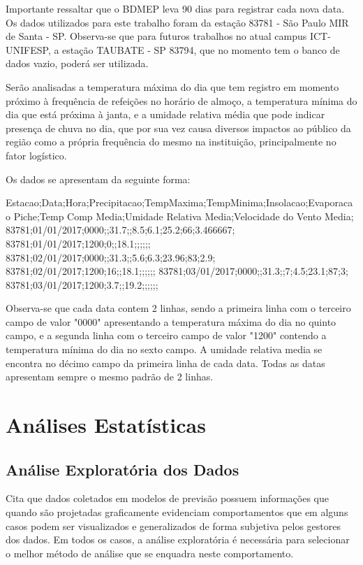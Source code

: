 \documentclass[	12pt, Times, openright, twoside, a4paper, english, brazil]{abntex2}
\begin{document}
Importante ressaltar que o BDMEP leva 90 dias para registrar cada nova data.
Os dados utilizados para este trabalho foram da estação 83781 - São Paulo MIR de Santa - SP.
Observa-se que para futuros trabalhos no atual campus ICT-UNIFESP, a estação TAUBATE - SP 83794, que no momento tem o banco de dados vazio, poderá ser utilizada.

Serão analisadas a temperatura máxima do dia que tem registro em momento próximo à frequência de refeições no horário de almoço, a temperatura mínima do dia que está próxima à janta, e a umidade relativa média que pode indicar presença de chuva no dia, que por sua vez causa diversos impactos ao público da região como a própria frequência do mesmo na instituição, principalmente no fator logístico. 

Os dados se apresentam da seguinte forma: 
\begin{algorithm}[H]
Estacao;Data;Hora;Precipitacao;TempMaxima;TempMinima;Insolacao;Evaporacao Piche;Temp Comp Media;Umidade Relativa Media;Velocidade do Vento Media;
83781;01/01/2017;0000;;31.7;;8.5;6.1;25.2;66;3.466667;
83781;01/01/2017;1200;0;;18.1;;;;;;
83781;02/01/2017;0000;;31.3;;5.6;6.3;23.96;83;2.9;
83781;02/01/2017;1200;16;;18.1;;;;;;
83781;03/01/2017;0000;;31.3;;7;4.5;23.1;87;3;
83781;03/01/2017;1200;3.7;;19.2;;;;;;
\end{algorithm}

Observa-se que cada data contem 2 linhas, sendo a primeira linha com o terceiro campo de valor "0000" apresentando a temperatura máxima do dia no quinto campo, e a segunda linha com o terceiro campo de valor "1200" contendo a temperatura mínima do dia no sexto campo.
A umidade relativa media se encontra no décimo campo da primeira linha de cada data.
Todas as datas apresentam sempre o mesmo padrão de 2 linhas.

\section{Análises Estatísticas}
\subsection{Análise Exploratória dos Dados}
\cite{Junior2007} Cita que dados coletados em modelos de previsão possuem informações que quando são projetadas graficamente evidenciam comportamentos que em alguns casos podem ser visualizados e generalizados de forma subjetiva pelos gestores dos dados.  
Em todos os casos, a análise exploratória é necessária para selecionar o melhor método de análise que se enquadra neste comportamento.
\end{document}
